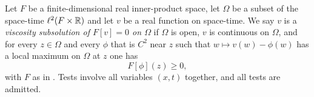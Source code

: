 \begin{definition}
Let $F$ be a finite-dimensional real inner-product space, let $\Omega$ be a
subset of the space-time $\ell^2(F\times\mathbb{R})$ and let $v$ be a real function on
space-time. We say $v$ is a \emph{viscosity subsolution of $F[v]=0$ on
$\Omega$} if $\Omega$ is open, $v$ is continuous on $\Omega$, and for every
$z\in\Omega$ and every $\phi$ that is $C^2$ near $z$ such that $w\mapsto
v(w)-\phi(w)$ has a local maximum on $\Omega$ at $z$ one has
\[
  F[\phi](z)\ge0,
\]
with $F$ as in . Tests involve all variables $(x,t)$ together,
and all tests are admitted.
\end{definition}
